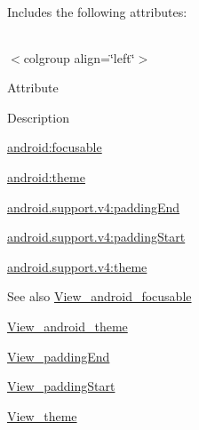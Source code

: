 Includes the following attributes\+:

\tabulinesep=1mm
\begin{longtabu} spread 0pt [c]{*{0}{|X[-1]}|}
\hline
\end{longtabu}
$<$colgroup align=\char`\"{}left\char`\"{}$>$ 

Attribute

Description 

{\ttfamily \hyperlink{classandroid_1_1support_1_1v4_1_1R_1_1styleable_aa77cd692bc8e686088574a84d3162278}{android\+:focusable}}

{\ttfamily \hyperlink{classandroid_1_1support_1_1v4_1_1R_1_1styleable_a96cb79802865a92d4109690435c275e2}{android\+:theme}}

{\ttfamily \hyperlink{classandroid_1_1support_1_1v4_1_1R_1_1styleable_aaf0551565567bdd67dbb44b8d96469f7}{android.\+support.\+v4\+:padding\+End}}

{\ttfamily \hyperlink{classandroid_1_1support_1_1v4_1_1R_1_1styleable_a8672f9bf1c5d1bbaf3c499fd347a58a7}{android.\+support.\+v4\+:padding\+Start}}

{\ttfamily \hyperlink{classandroid_1_1support_1_1v4_1_1R_1_1styleable_ad8eb1747750c305519d79611a84ea08b}{android.\+support.\+v4\+:theme}}

\begin{DoxySeeAlso}{See also}
\hyperlink{classandroid_1_1support_1_1v4_1_1R_1_1styleable_aa77cd692bc8e686088574a84d3162278}{View\+\_\+android\+\_\+focusable} 

\hyperlink{classandroid_1_1support_1_1v4_1_1R_1_1styleable_a96cb79802865a92d4109690435c275e2}{View\+\_\+android\+\_\+theme} 

\hyperlink{classandroid_1_1support_1_1v4_1_1R_1_1styleable_aaf0551565567bdd67dbb44b8d96469f7}{View\+\_\+padding\+End} 

\hyperlink{classandroid_1_1support_1_1v4_1_1R_1_1styleable_a8672f9bf1c5d1bbaf3c499fd347a58a7}{View\+\_\+padding\+Start} 

\hyperlink{classandroid_1_1support_1_1v4_1_1R_1_1styleable_ad8eb1747750c305519d79611a84ea08b}{View\+\_\+theme} 
\end{DoxySeeAlso}
\mbox{\label{classandroid_1_1support_1_1v4_1_1R_1_1styleable_aa77cd692bc8e686088574a84d3162278}} 
